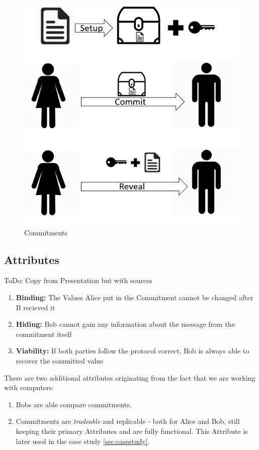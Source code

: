 \documentclass[conference]{IEEEtran}
\begin{document}
\begin{figure}
	\centering
	\includegraphics[width=0.8\linewidth]{Images/protocoll}
	\caption[Commitments]{Commitments}
	\label{fig:protocoll}
\end{figure}

\subsection{Attributes}
ToDo: Copy from Presentation but with sources

\begin{enumerate}
	\item \textbf{Binding:} The Values Alice put in the Commitment cannot be changed after B recieved it 
	\item \textbf{Hiding:} Bob cannot gain any information about the message from the commitment itself
	\item \textbf{Viability:} If both parties follow the protocol correct, Bob is always able to recover the committed value
\end{enumerate}
There are two additional attributes originating from the fact that we are working with computers:
\begin{enumerate}
	\item Bobs are able compare commitments.
	\item Commitments are \textit{tradeable} and replicable - both for Alice and Bob, still keeping their primary Attributes and are fully functional. This Attribute is later used in the case study \ref{sec:casestudy}.
\end{enumerate}
\end{document}

